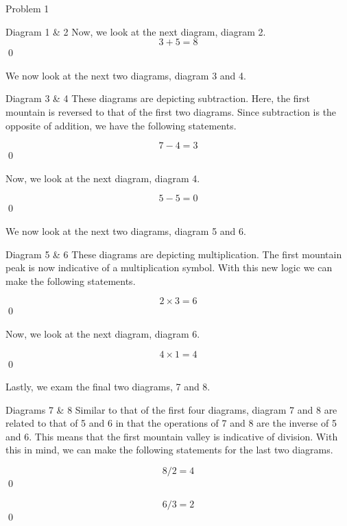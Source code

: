\begin{problem}{Problem 1}
\begin{Highlight}{Diagram 1 \& 2}
        Now, we look at the next diagram, diagram 2.
        \begin{equation}
            3 + 5 = 8
        \end{equation}
        \qed
    \end{Highlight}

    We now look at the next two diagrams, diagram 3 and 4.

    \begin{Highlight}{Diagram 3 \& 4}
        These diagrams are depicting subtraction. Here, the first mountain is reversed to that of the first two diagrams. Since subtraction is the opposite of addition, we have the following statements.

        \begin{equation}
            7 - 4 = 3
        \end{equation}
        \qed

        Now, we look at the next diagram, diagram 4.

        \begin{equation}
            5 - 5 = 0
        \end{equation}
        \qed
    \end{Highlight}

    We now look at the next two diagrams, diagram 5 and 6.

    \begin{Highlight}{Diagram 5 \& 6}
        These diagrams are depicting multiplication. The first mountain peak is now indicative of a multiplication symbol. With this new logic we can make the following statements.

        \begin{equation}
            2 \times 3 = 6
        \end{equation}
        \qed

        Now, we look at the next diagram, diagram 6.

        \begin{equation}
            4 \times 1 = 4
        \end{equation}
        \qed
    \end{Highlight}

    Lastly, we exam the final two diagrams, 7 and 8.

    \begin{Highlight}{Diagrams 7 \& 8}
        Similar to that of the first four diagrams, diagram 7 and 8 are related to that of 5 and 6 in that the operations of 7 and 8 are the inverse of 5 and 6. This means that the first
        mountain valley is indicative of division. With this in mind, we can make the following statements for the last two diagrams.

        \begin{equation}
            8 / 2 = 4
        \end{equation}
        \qed

        \begin{equation}
            6 / 3 = 2
        \end{equation}
        \qed
    \end{Highlight}
\end{problem}

